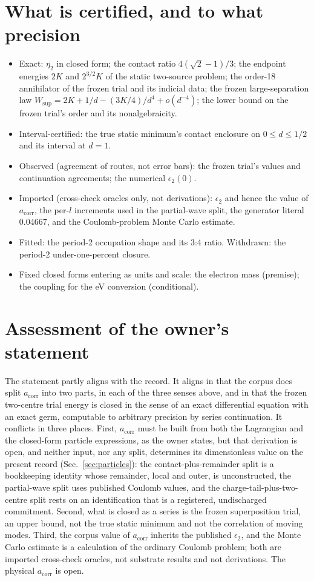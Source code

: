 \documentclass[aps,prd,onecolumn,amsmath,amssymb,longbibliography,floatfix,nofootinbib]{revtex4-2}
\newcommand{\acorr}{a_{\mathrm{corr}}}
\newcommand{\Wsup}{W_{\mathrm{sup}}}
\begin{document}
\section{What is certified, and to what precision}
\begin{itemize}
\item Exact: $\eta_2$ in closed form; the contact ratio $4(\sqrt2-1)/3$; the endpoint energies $2K$ and $2^{3/2}K$ of the static two-source problem; the order-18 annihilator of the frozen trial and its indicial data; the frozen large-separation law $\Wsup=2K+1/d-(3K/4)/d^4+o(d^{-4})$; the lower bound \SelectedLowerVal{} on the frozen trial's order and its nonalgebraicity.
\item Interval-certified: the true static minimum's contact enclosure on $0\le d\le1/2$ and its interval at $d=1$.
\item Observed (agreement of routes, not error bars): the frozen trial's values and continuation agreements; the numerical $\epsilon_2(0)$.
\item Imported (cross-check oracles only, not derivations): $\epsilon_2$ and hence the value of $\acorr$, the per-$l$ increments used in the partial-wave split, the generator literal 0.04667, and the Coulomb-problem Monte Carlo estimate.
\item Fitted: the period-2 occupation shape and its 3:4 ratio. Withdrawn: the period-2 under-one-percent closure.
\item Fixed closed forms entering as units and scale: the electron mass (premise); the coupling for the eV conversion (conditional).
\end{itemize}

\section{Assessment of the owner's statement}
The statement partly aligns with the record. It aligns in that the corpus does split $\acorr$ into two parts, in each of the three senses above, and in that the frozen two-centre trial energy is closed in the sense of an exact differential equation with an exact germ, computable to arbitrary precision by series continuation. It conflicts in three places. First, $\acorr$ must be built from both the Lagrangian and the closed-form particle expressions, as the owner states, but that derivation is open, and neither input, nor any split, determines its dimensionless value on the present record (Sec.~\ref{sec:particles}): the contact-plus-remainder split is a bookkeeping identity whose remainder, local and outer, is unconstructed, the partial-wave split uses published Coulomb values, and the charge-tail-plus-two-centre split rests on an identification that is a registered, undischarged commitment. Second, what is closed as a series is the frozen superposition trial, an upper bound, not the true static minimum and not the correlation of moving modes. Third, the corpus value of $\acorr$ inherits the published $\epsilon_2$, and the Monte Carlo estimate is a calculation of the ordinary Coulomb problem; both are imported cross-check oracles, not substrate results and not derivations. The physical $\acorr$ is open.
\end{document}
